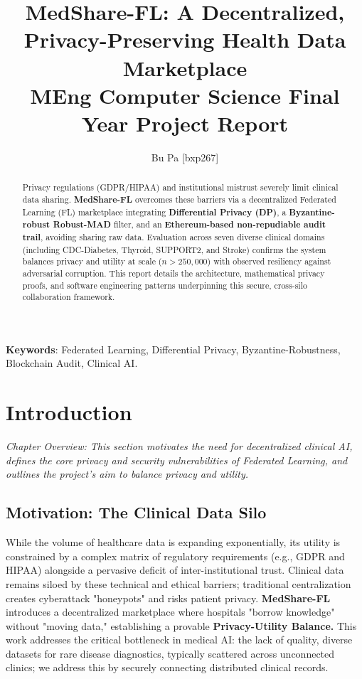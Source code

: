\documentclass[10pt, a4paper, twocolumn]{article}
\title{\textbf{MedShare-FL: A Decentralized, Privacy-Preserving Health Data Marketplace} \\ \Large MEng Computer Science Final Year Project Report}
\author{Bu Pa [bxp267]}
\date{}
\begin{document}
\maketitle

\begin{abstract}
Privacy regulations (GDPR/HIPAA) and institutional mistrust severely limit clinical data sharing. \textbf{MedShare-FL} overcomes these barriers via a decentralized Federated Learning (FL) marketplace integrating \textbf{Differential Privacy (DP)}, a \textbf{Byzantine-robust Robust-MAD} filter, and an \textbf{Ethereum-based non-repudiable audit trail}, avoiding sharing raw data. Evaluation across seven diverse clinical domains (including CDC-Diabetes, Thyroid, SUPPORT2, and Stroke) confirms the system balances privacy and utility at scale ($n > 250,000$) with observed resiliency against adversarial corruption. This report details the architecture, mathematical privacy proofs, and software engineering patterns underpinning this secure, cross-silo collaboration framework.
\end{abstract}

\textbf{Keywords}: Federated Learning, Differential Privacy, Byzantine-Robustness, Blockchain Audit, Clinical AI.


\begin{center}
\end{center}

\section{Introduction}

\textit{Chapter Overview: This section motivates the need for decentralized clinical AI, defines the core privacy and security vulnerabilities of Federated Learning, and outlines the project's aim to balance privacy and utility.}
\subsection{Motivation: The Clinical Data Silo}
While the volume of healthcare data is expanding exponentially, its utility is constrained by a complex matrix of regulatory requirements (e.g., GDPR and HIPAA) alongside a pervasive deficit of inter-institutional trust. Clinical data remains siloed by these technical and ethical barriers; traditional centralization creates cyberattack "honeypots" and risks patient privacy. \textbf{MedShare-FL} introduces a decentralized marketplace where hospitals "borrow knowledge" without "moving data," establishing a provable \textbf{Privacy-Utility Balance.} This work addresses the critical bottleneck in medical AI: the lack of quality, diverse datasets for rare disease diagnostics, typically scattered across unconnected clinics; we address this by securely connecting distributed clinical records.
\end{document}

